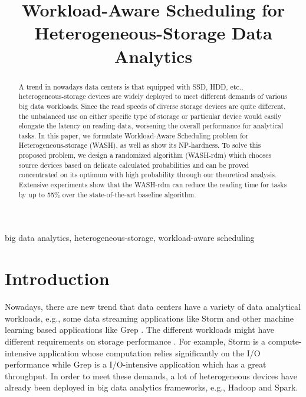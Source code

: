 \documentclass[conference]{IEEEtran}
\begin{document}
\title{Workload-Aware Scheduling for Heterogeneous-Storage Data Analytics\\
}

\author{
}


\maketitle
\begin{abstract}
A trend in nowadays data centers is that equipped with SSD, HDD, etc., heterogeneous-storage devices are widely deployed to meet different demands of various big data workloads. Since the read speeds of diverse storage devices are quite different, the unbalanced use on either specific type of storage or particular device would easily elongate the latency on reading data, worsening the overall performance for analytical tasks. In this paper, we formulate Workload-Aware Scheduling problem for Heterogeneous-storage (WASH), as well as show its NP-hardness. To solve this proposed problem, we design a randomized algorithm (WASH-rdm) which chooses source devices based on delicate calculated probabilities and can be proved concentrated on its optimum with high probability through our theoretical analysis. Extensive experiments show that the WASH-rdm can reduce the reading time for tasks by up to 55\% over the state-of-the-art baseline algorithm. 

\end{abstract}

\begin{IEEEkeywords}
big data analytics, heterogeneous-storage, workload-aware scheduling
\end{IEEEkeywords}

\section{Introduction}

Nowadays, there are new trend that data centers have a variety of data analytical workloads, e.g., some data streaming applications like Storm
\cite{b40} and other machine learning based applications like Grep \cite{b27}. The different workloads might have different requirements on storage performance \cite{b28} \cite{b29} \cite{b30} \cite{b31}. For example, Storm is a compute-intensive application whose computation relies significantly on the I/O performance while Grep is a I/O-intensive application which has a great throughput. In order to meet these demands, a lot of heterogeneous devices have already been deployed in big data analytics frameworks, e.g., Hadoop \cite{b14} and Spark\cite{b15}.
\end{document}
